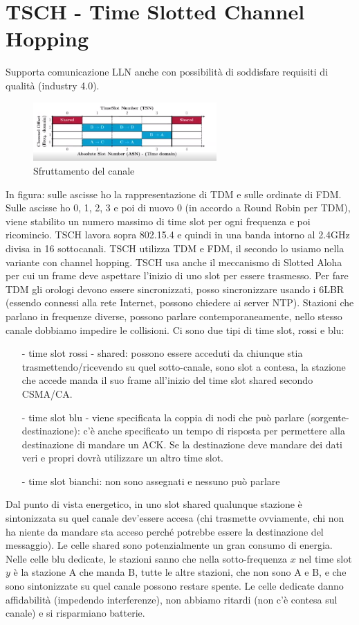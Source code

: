 \documentclass[12pt,italian]{report}
\begin{document}
\section{TSCH - Time Slotted Channel Hopping}
Supporta comunicazione LLN anche con possibilità di soddisfare requisiti di qualità (industry 4.0). 
\begin{figure}[h]
\centering
\includegraphics[width=70mm]{img/tsch.PNG}
\caption{Sfruttamento del canale}
\label{fig:tschcanale}
\end{figure}
\noindent In figura: sulle ascisse ho la rappresentazione di TDM e sulle ordinate di FDM. Sulle ascisse ho 0, 1, 2, 3 e poi di nuovo 0 (in accordo a Round Robin per TDM), viene stabilito un numero massimo di time slot per ogni frequenza e poi ricomincio.
\bigbreak
TSCH lavora sopra 802.15.4 e quindi in una banda intorno al 2.4GHz divisa in 16 sottocanali. TSCH utilizza TDM e FDM, il secondo lo usiamo nella variante con channel hopping.  TSCH usa anche il meccanismo di Slotted Aloha per cui un frame deve aspettare l'inizio di uno slot per essere trasmesso. 
\bigbreak
Per fare TDM gli orologi devono essere sincronizzati, posso sincronizzare usando i 6LBR (essendo connessi alla rete Internet, possono chiedere ai server NTP).
\bigbreak
Stazioni che parlano in frequenze diverse, possono parlare contemporaneamente, nello stesso canale dobbiamo impedire le collisioni. Ci sono due tipi di time slot, rossi e blu:
\begin{itemize}
    \item [-] time slot rossi - shared:  possono essere acceduti da chiunque stia trasmettendo/ricevendo su quel sotto-canale, sono slot a contesa, la stazione che accede manda il suo frame all'inizio del time slot shared secondo CSMA/CA.
    \item [-] time slot blu - viene specificata la coppia di nodi che può parlare (sorgente-destinazione): c'è anche specificato un tempo di risposta per permettere alla destinazione di mandare un ACK. Se la destinazione deve mandare dei dati veri e propri dovrà utilizzare un altro time slot. 
    \item [-] time slot bianchi: non sono assegnati e nessuno può parlare
\end{itemize}
Dal punto di vista energetico, in uno slot shared qualunque stazione è sintonizzata su quel canale dev'essere accesa (chi trasmette ovviamente, chi non ha niente da mandare sta acceso perché potrebbe essere la destinazione del messaggio). Le celle shared sono potenzialmente un gran consumo di energia. \\ Nelle celle blu dedicate, le stazioni sanno che nella sotto-frequenza $x$ nel time slot $y$ è la stazione A che manda B, tutte le altre stazioni, che non sono A e B, e che sono sintonizzate su quel canale possono restare spente. Le celle dedicate danno affidabilità (impedendo interferenze), non abbiamo ritardi (non c'è contesa sul canale) e si risparmiano batterie. 
\end{document}
